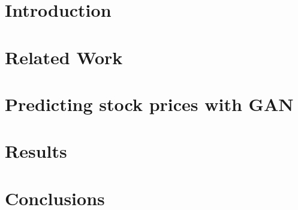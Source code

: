 \documentclass{thesis}
\begin{document}
\maketitle





\thesisTables
\thesisBodyStart

\chapter{Introduction}


\chapter{Related Work}


\chapter{Predicting stock prices with GAN}


\chapter{Results}


\chapter{Conclusions}


\printReferences
\thesisTOT
\thesisTOF
\end{document}
